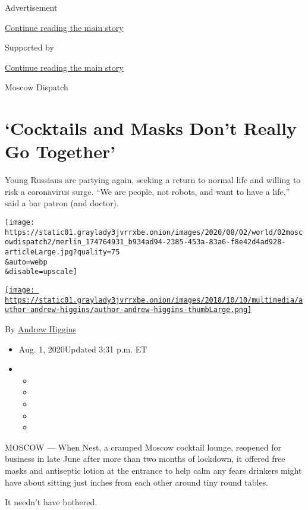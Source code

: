 Advertisement

\protect\hyperlink{after-top}{Continue reading the main story}

Supported by

\protect\hyperlink{after-sponsor}{Continue reading the main story}

Moscow Dispatch

\hypertarget{cocktails-and-masks-dont-really-go-together}{%
\section{`Cocktails and Masks Don't Really Go
Together'}\label{cocktails-and-masks-dont-really-go-together}}

Young Russians are partying again, seeking a return to normal life and
willing to risk a coronavirus surge. ``We are people, not robots, and
want to have a life,'' said a bar patron (and doctor).

\texttt{[image: https://static01.graylady3jvrrxbe.onion/images/2020/08/02/world/02moscowdispatch2/merlin\_174764931\_b934ad94-2385-453a-83a6-f8e42d4ad928-articleLarge.jpg?quality=75\\\&auto=webp\\\&disable=upscale]}

\href{https://www.nytimes3xbfgragh.onion/by/andrew-higgins}{\texttt{[image: https://static01.graylady3jvrrxbe.onion/images/2018/10/10/multimedia/author-andrew-higgins/author-andrew-higgins-thumbLarge.png]}}

By \href{https://www.nytimes3xbfgragh.onion/by/andrew-higgins}{Andrew
Higgins}

\begin{itemize}
\item
  Aug. 1, 2020Updated 3:31 p.m. ET
\item
  \begin{itemize}
  \item
  \item
  \item
  \item
  \item
  \end{itemize}
\end{itemize}

MOSCOW --- When Nest, a cramped Moscow cocktail lounge, reopened for
business in late June after more than two months of lockdown, it offered
free masks and antiseptic lotion at the entrance to help calm any fears
drinkers might have about sitting just inches from each other around
tiny round tables.

It needn't have bothered.


